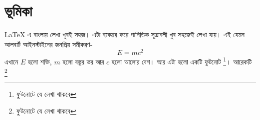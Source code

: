 \documentclass{article}
\begin{document}
\section*{ভূমিকা}


LaTeX এ বাংলায় লেখা খুবই সহজ। এটা ব্যবহার করে গানিতিক সূত্রাবলী খুব সহজেই লেখা যায়। 
 এই যেমন আলবার্ট আইনস্টাইনের জনপ্রিয় সমীকরণ-
\begin{equation}
E=mc^2
\end{equation} 
এখানে $E$ হলো শক্তি, $m$ হলো বস্তুর ভর আর $c$ হলো আলোর বেগ। আর এটা হলো একটি ফুটনোট \footnote[*]{ফুটনোটে যে লেখা থাকবে}। আরেকটি \footnote[**]{ফুটনোটে যে লেখা থাকবে}
\end{document}
